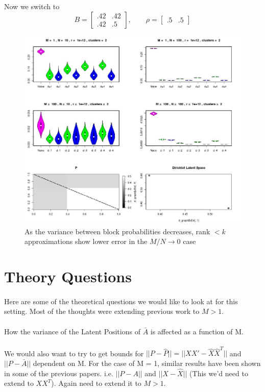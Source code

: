 \documentclass[11pt]{article}
\begin{document}
\newpage
Now we switch to \begin{equation*}
B = \begin{bmatrix}
.42 & .42 \\
.42 & .5 
\end{bmatrix}
,\qquad \rho = \begin{bmatrix}
.5 & .5
\end{bmatrix}
\end{equation*}
\begin{figure}[!htb]
	\centering
	\includegraphics[width=18cm]{Capture4.jpg}
	\caption{As the variance between block probabilities decreases, rank $< k$ approximations show lower error in the $M/N \rightarrow 0$ case}
	\label{fig:plot1}
\end{figure}
\newpage
\section{Theory Questions}
\paragraph{} Here are some of the theoretical questions we would like to look at for this setting. Most of the thoughts were extending previous work to $M > 1$. 
\\\\
How the variance of the Latent Positions  of $\bar{A}$ is affected as a function of M.
\\\\
We would also want to try to get bounds for $|| P - \hat{P}|| = || XX' - \hat{X}\hat{X}^T||$  and $|| P - \bar{A} ||$ dependent on M.  For the case of M = 1,  similar results have been shown in some of the previous papers.  i.e. $|| P - A ||$ and $|| X - \hat{X}||$ (This we'd need to extend to $XX^T$).  Again need to extend it to $M>1$.
\end{document}
